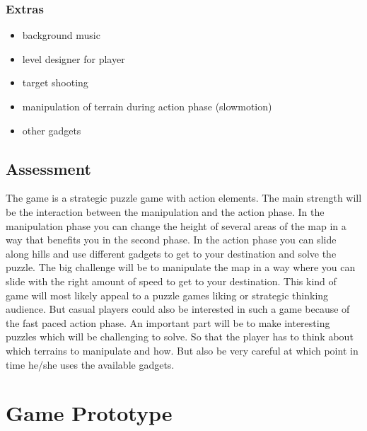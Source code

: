 \documentclass[12pt, letterpaper]{scrartcl}
\begin{document}
	\subsubsection{Extras}
	\begin{itemize}
		\setlength\itemsep{0.1pt}
		\item background music
		\item level designer for player
		\item target shooting
		\item manipulation of terrain during action phase (slowmotion)
		\item other gadgets
	\end{itemize}
	
	\subsection{Assessment}
	The game is a strategic puzzle game with action elements. The main strength will be the interaction between the manipulation and the action phase. In the manipulation phase you can change the height of several areas of the map in a way that benefits you in the second phase. In the action phase you can slide along hills and use different gadgets to get to your destination and solve the puzzle. The big challenge will be to manipulate the map in a way where you can slide with the right amount of speed to get to your destination.
	This kind of game will most likely appeal to a puzzle games liking or strategic thinking audience. But casual players could also be interested in such a game because of the fast paced action phase.
	An important part will be to make interesting puzzles which will be challenging to solve. So that the player has to think about which terrains to manipulate and how. But also be very careful at which point in time he/she uses the available gadgets.
	
	\newpage
	\newpage
	\section{Game Prototype}
\end{document}
